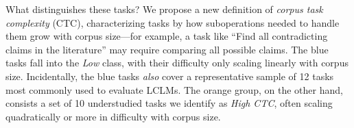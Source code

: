 What distinguishes these tasks? We propose a new definition of \emph{corpus task complexity} (CTC), characterizing tasks by how suboperations needed to handle them grow with corpus size---for example, a task like ``Find all contradicting claims in the literature'' may require comparing all possible claims. The blue tasks fall into the \emph{Low \cname} class, with their difficulty only scaling linearly with corpus size. Incidentally, the blue tasks \emph{also} cover a representative sample of 12 tasks most commonly used to evaluate LCLMs. The orange group, on the other hand, consists a set of 10 understudied tasks we identify as \emph{High CTC}, often scaling quadratically or more in difficulty with corpus size.





